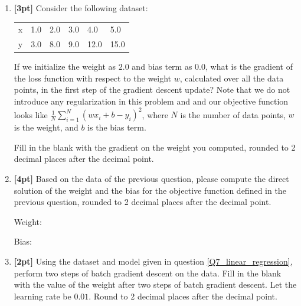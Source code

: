 \documentclass[12pt]{article}
\begin{document}
\begin{enumerate}
    
    \clearpage
    
    \item \textbf{[3pt]} \label{Q7_linear_regression} Consider the following dataset:
    \begin{table}[H]
    \centering
        \begin{tabular}{llllll}
        x & 1.0 & 2.0 & 3.0 & 4.0 & 5.0 \\
        y & 3.0 & 8.0 & 9.0 & 12.0 & 15.0
        \end{tabular}
    \end{table}
    If we initialize the weight as $2.0$ and bias term as $0.0$, what is the gradient of the loss function with respect to the weight $w$, calculated over all the data points, in the first step of the gradient descent update? Note that we do not introduce any regularization in this problem and and our objective function looks like $\frac{1}{N}\sum_{i=1}^N (wx_i + b - y_i)^2$, where $N$ is the number of data points, $w$ is the weight, and $b$ is the bias term.
    
    Fill in the blank with the gradient on the weight you computed, rounded to 2 decimal places after the decimal point.
    
    \begin{tcolorbox}[fit,height=1cm, width=4cm, blank, borderline={1pt}{-2pt},nobeforeafter]
    \end{tcolorbox}
    
    
    
    \item \textbf{[4pt]} Based on the data of the previous question, please compute the direct solution of the weight and the bias for the objective function defined in the previous question, rounded to 2 decimal places after the decimal point.
    
    Weight: \quad
    \begin{tcolorbox}[fit,height=1cm, width=4cm, blank, borderline={1pt}{-2pt},nobeforeafter]
    \end{tcolorbox}
    
    
    Bias: \quad
    \begin{tcolorbox}[fit,height=1cm, width=4cm, blank, borderline={1pt}{-2pt},nobeforeafter]
    \end{tcolorbox}
    
    
    
    \item \textbf{[2pt]} Using the dataset and model given in question \ref{Q7_linear_regression}, perform two steps of batch gradient descent on the data. Fill in the blank with the value of the weight after two steps of batch gradient descent. Let the learning rate be $0.01$. Round to 2 decimal places after the decimal point.
    

\end{enumerate}
\end{document}
